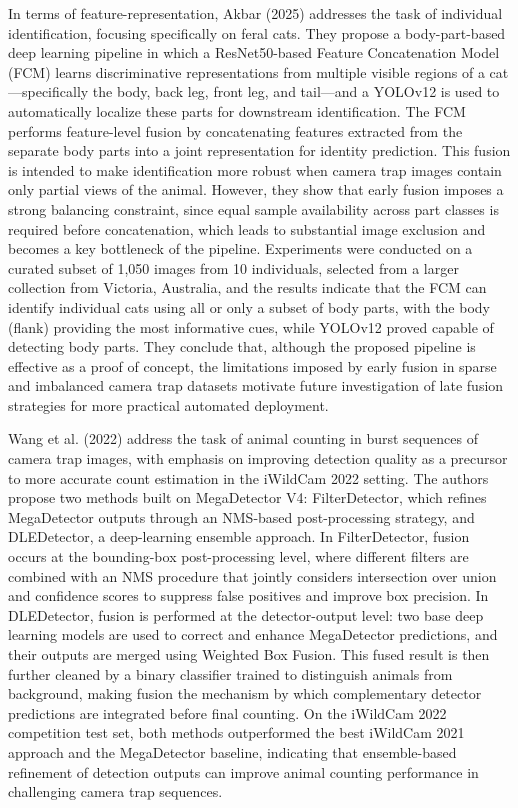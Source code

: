 In terms of feature-representation, Akbar (2025) \citep{akbar2025individual} addresses the task of individual identification, focusing specifically on feral cats. They propose a body-part-based deep learning pipeline in which a ResNet50-based Feature Concatenation Model (FCM) learns discriminative representations from multiple visible regions of a cat—specifically the body, back leg, front leg, and tail—and a YOLOv12 is used to automatically localize these parts for downstream identification. The FCM performs feature-level fusion by concatenating features extracted from the separate body parts into a joint representation for identity prediction. This fusion is intended to make identification more robust when camera trap images contain only partial views of the animal. However, they show that early fusion imposes a strong balancing constraint, since equal sample availability across part classes is required before concatenation, which leads to substantial image exclusion and becomes a key bottleneck of the pipeline. Experiments were conducted on a curated subset of 1,050 images from 10 individuals, selected from a larger collection from Victoria, Australia, and the results indicate that the FCM can identify individual cats using all or only a subset of body parts, with the body (flank) providing the most informative cues, while YOLOv12 proved capable of detecting body parts. They conclude that, although the proposed pipeline is effective as a proof of concept, the limitations imposed by early fusion in sparse and imbalanced camera trap datasets motivate future investigation of late fusion strategies for more practical automated deployment.

Wang et al. (2022) \citep{wang2022deep} address the task of animal counting in burst sequences of camera trap images, with emphasis on improving detection quality as a precursor to more accurate count estimation in the iWildCam 2022 setting. The authors propose two methods built on MegaDetector V4: FilterDetector, which refines MegaDetector outputs through an NMS-based post-processing strategy, and DLEDetector, a deep-learning ensemble approach. In FilterDetector, fusion occurs at the bounding-box post-processing level, where different filters are combined with an NMS procedure that jointly considers intersection over union and confidence scores to suppress false positives and improve box precision. In DLEDetector, fusion is performed at the detector-output level: two base deep learning models are used to correct and enhance MegaDetector predictions, and their outputs are merged using Weighted Box Fusion. This fused result is then further cleaned by a binary classifier trained to distinguish animals from background, making fusion the mechanism by which complementary detector predictions are integrated before final counting. On the iWildCam 2022 competition test set, both methods outperformed the best iWildCam 2021 approach and the MegaDetector baseline, indicating that ensemble-based refinement of detection outputs can improve animal counting performance in challenging camera trap sequences.


